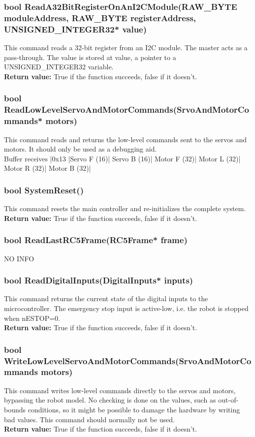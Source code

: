 \documentclass{book}
\begin{document}
\subsubsection{	bool ReadA32BitRegisterOnAnI2CModule(RAW\_BYTE moduleAddress, RAW\_BYTE registerAddress, UNSIGNED\_INTEGER32* value)}
This command reads a 32-bit register from an I2C module. The master acts as a pass-through. The value is stored at value, a pointer to a UNSIGNED\_INTEGER32 variable.\\
\textbf{Return value: }True if the function succeeds, false if it doesn't.\\ 

\subsubsection{bool ReadLowLevelServoAndMotorCommands(SrvoAndMotorCommands* motors)}
This command reads and returns the low-level commands sent to the servos and motors. It should only be used as a debugging aid.\\
Buffer receives |0x13 |Servo F (16)| Servo B (16)| Motor F (32)| Motor L (32)| Motor R (32)| Motor B (32)|\\
\subsubsection{bool SystemReset()}
This command resets the main controller and re-initializes the complete system.\\
\textbf{Return value: }True if the function succeeds, false if it doesn't.\\ 

\subsubsection{bool ReadLastRC5Frame(RC5Frame* frame)}
NO INFO
\subsubsection{	bool ReadDigitalInputs(DigitalInputs* inputs)}
This command returns the current state of the digital inputs to the microcontroller. The emergency stop input is active-low, i.e. the robot is stopped when nESTOP=0.\\
\textbf{Return value: }True if the function succeeds, false if it doesn't.\\ 

\subsubsection{	bool WriteLowLevelServoAndMotorCommands(SrvoAndMotorCommands motors)}
This command writes low-level commands directly to the servos and motors, bypassing the robot model. No checking is done on the values, such as out-of-bounds conditions, so it might be possible to damage the hardware by writing bad values. This command should normally not be used.\\
\textbf{Return value: }True if the function succeeds, false if it doesn't.\\ 
\end{document}
